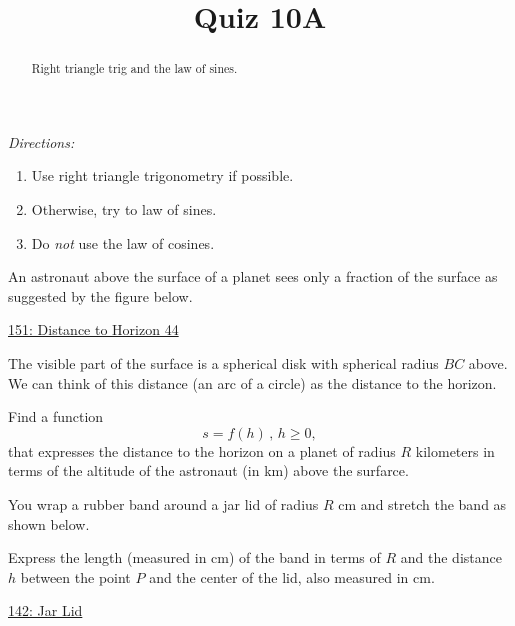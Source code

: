 \documentclass{ximera}
\title{Quiz 10A}
\begin{document}
\begin{abstract}
Right triangle trig and the law of sines.
\end{abstract}
\maketitle



\emph{Directions:}
\begin{enumerate}
\item  Use right triangle trigonometry if possible. 

\item Otherwise, try to law of sines. 

\item Do \emph{not} use the law of cosines.
\end{enumerate}


\begin{question} \label{ExKdfdKREGER}
An astronaut above the surface of a planet sees only a fraction of the surface as suggested by the figure below.

\begin{onlineOnly}
    \begin{center}
\end{center}
\end{onlineOnly}

\href{https://www.desmos.com/calculator/8shf1msp4m}{151: Distance to Horizon 44}

The visible part of the surface is a spherical disk with spherical radius $BC$ above. We can think of this distance (an arc of a circle) as the distance to the horizon.

Find a function 
\[
   s = f(h) \, , \, h\geq 0,
\]
that expresses the distance to the horizon on a planet of radius $R$ kilometers in terms of the altitude of the astronaut (in km) above the surfarce.

\end{question}



\begin{question} \label{QdfRDEfeERER}
You wrap a rubber band around a jar lid of radius $R$ cm and stretch the band as shown below.

Express the length (measured in cm) of the band in terms of $R$ and the distance $h$ between the point $P$ and the center of the lid, also measured in cm.


\begin{onlineOnly}
    \begin{center}
\end{center}
\end{onlineOnly}

\href{https://www.desmos.com/calculator/wz5qiyj4od}{142: Jar Lid}

\end{question}
\end{document}
